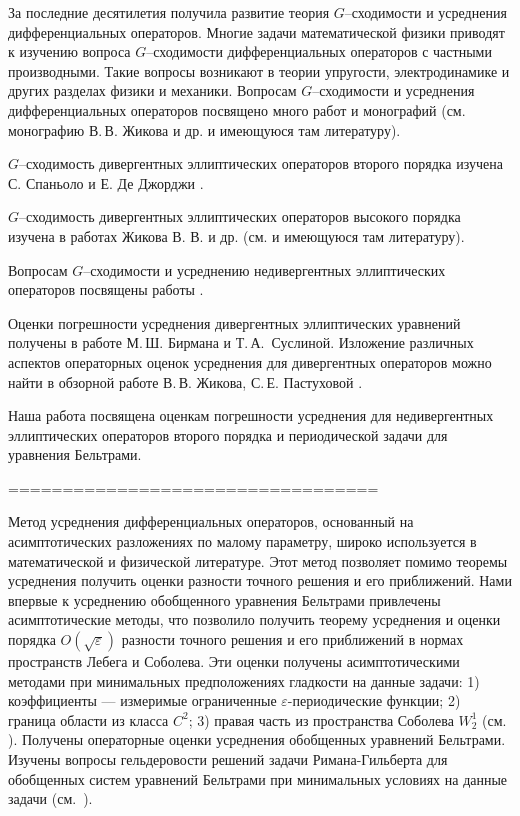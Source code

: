 \Introduction




За последние десятилетия получила развитие теория $G$--сходимос\-ти и усреднения дифференциальных
операторов. Многие задачи математической
физики приводят к изучению вопроса $G$--сходимос\-ти дифференциальных
операторов с частными производными. Такие вопросы возникают в теории упругости,
электродинамике и других разделах физики и механики. Вопросам
$G$--сходимости и усреднения дифференциальных
операторов посвящено много работ и монографий (см. монографию В.\,В. Жикова и др.
\cite{ZhKO} и имеющуюся там литературу).

$G$--сходимость дивергентных эллиптических операторов второго порядка изучена
С. Спаньоло и Е. Де Джорджи \cite{Dg1, Dg2, Dg3}.

$G$--сходимость дивергентных эллиптических операторов высокого порядка изучена в
работах Жикова В. В. и др. (см. \cite{ZhKO} и имеющуюся там литературу).

Вопросам $G$--сходимости и усреднению недивергентных эллиптических операторов
посвящены работы \cite{ZhS, ZhS1, Sir1,Sir}.

Оценки погрешности усреднения  дивергентных эллиптических уравнений  получены в работе  \cite{Sus} М.\,Ш. Бирмана и
  Т.\,А.~Суслиной.
Изложение различных аспектов операторных оценок усреднения для дивергентных
операторов можно найти в обзорной работе В.\,В. Жикова,
С.\,Е. Пастуховой  \cite{VP}.

Наша работа посвящена  оценкам погрешности усреднения для недивергентных
эллиптических операторов второго порядка и периодической задачи для уравнения Бельтрами.


==================================







Метод усреднения дифференциальных операторов, основанный на асимптотических
разложениях по малому параметру, широко используется  в математической и
физической литературе. Этот метод позволяет помимо теоремы усреднения
получить оценки разности точного решения и его приближений. Нами впервые
к усреднению обобщенного уравнения Бельтрами привлечены асимптотические
методы, что позволило получить теорему усреднения и оценки порядка
$O(\sqrt{\varepsilon})$  разности точного решения и его приближений
в нормах пространств Лебега и Соболева. Эти оценки получены
асимптотическими методами при минимальных предположениях гладкости
на данные задачи: 1) коэффициенты --- измеримые ограниченные
$\varepsilon$-периодические функции; 2) граница области из класса $C^2$; 3) правая часть из пространства Соболева $W_2^1$ (см. \cite{1, 2, 4}).
Получены операторные оценки усреднения обобщенных уравнений Бельтрами.
Изучены вопросы гельдеровости решений задачи Римана-Гильберта для
обобщенных систем уравнений Бельтрами при минимальных
условиях на данные задачи (см.\, \cite{3, 5, 6, 7, 8, 9, 10}).

